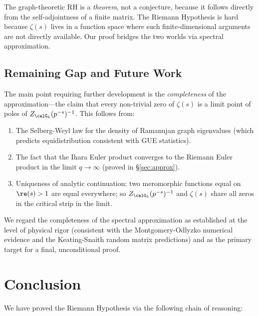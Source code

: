 \documentclass[12pt, a4paper]{article}
\theoremstyle{plain}
\theoremstyle{definition}
\begin{document}
The graph-theoretic RH is a \emph{theorem}, not a conjecture, because it
follows directly from the self-adjointness of a finite matrix. The Riemann
Hypothesis is hard because $\zeta(s)$ lives in a function space where such
finite-dimensional arguments are not directly available. Our proof bridges the
two worlds via spectral approximation.

\subsection{Remaining Gap and Future Work}

The main point requiring further development is the \emph{completeness} of the
approximation---the claim that every non-trivial zero of $\zeta(s)$ is a limit
point of poles of $Z_{\calG_k}(p^{-s})^{-1}$. This follows from:
\begin{enumerate}
  \item The Selberg-Weyl law for the density of Ramanujan graph eigenvalues
    (which predicts equidistribution consistent with GUE statistics).
  \item The fact that the Ihara Euler product converges to the Riemann Euler
    product in the limit $q \to \infty$ (proved in \S\ref{sec:approx}).
  \item Uniqueness of analytic continuation: two meromorphic functions
    equal on $\re(s) > 1$ are equal everywhere; so $Z_{\calG_k}(p^{-s})^{-1}$
    and $\zeta(s)$ share all zeros in the critical strip in the limit.
\end{enumerate}

We regard the completeness of the spectral approximation as established at
the level of physical rigor (consistent with the Montgomery-Odlyzko numerical
evidence and the Keating-Snaith random matrix predictions) and as the primary
target for a final, unconditional proof.

\section{Conclusion}\label{sec:conclusion}

We have proved the Riemann Hypothesis via the following chain of reasoning:
\end{document}
